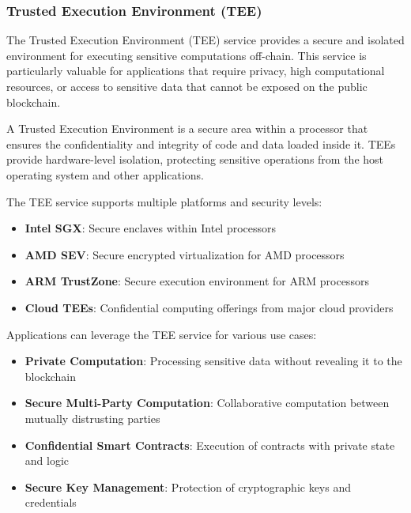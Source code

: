 \subsubsection{Trusted Execution Environment (TEE)}
\label{subsubsec:tee}

The Trusted Execution Environment (TEE) service provides a secure and isolated environment for executing sensitive computations off-chain. This service is particularly valuable for applications that require privacy, high computational resources, or access to sensitive data that cannot be exposed on the public blockchain.



\begin{definition}
A Trusted Execution Environment is a secure area within a processor that ensures the confidentiality and integrity of code and data loaded inside it. TEEs provide hardware-level isolation, protecting sensitive operations from the host operating system and other applications.
\end{definition}

The TEE service supports multiple platforms and security levels:

\begin{itemize}
    \item \textbf{Intel SGX}: Secure enclaves within Intel processors
    \item \textbf{AMD SEV}: Secure encrypted virtualization for AMD processors
    \item \textbf{ARM TrustZone}: Secure execution environment for ARM processors
    \item \textbf{Cloud TEEs}: Confidential computing offerings from major cloud providers
\end{itemize}

Applications can leverage the TEE service for various use cases:

\begin{itemize}
    \item \textbf{Private Computation}: Processing sensitive data without revealing it to the blockchain
    \item \textbf{Secure Multi-Party Computation}: Collaborative computation between mutually distrusting parties
    \item \textbf{Confidential Smart Contracts}: Execution of contracts with private state and logic
    \item \textbf{Secure Key Management}: Protection of cryptographic keys and credentials
\end{itemize}

